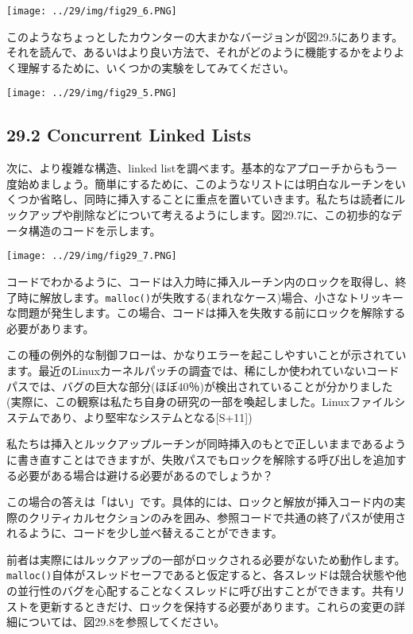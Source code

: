 \texttt{[image: ../29/img/fig29\_6.PNG]}

このようなちょっとしたカウンターの大まかなバージョンが図29.5にあります。それを読んで、あるいはより良い方法で、それがどのように機能するかをよりよく理解するために、いくつかの実験をしてみてください。

\texttt{[image: ../29/img/fig29\_5.PNG]}

\hypertarget{concurrent-linked-lists}{%
\subsection*{29.2 Concurrent Linked
Lists}\label{concurrent-linked-lists}}

次に、より複雑な構造、linked
listを調べます。基本的なアプローチからもう一度始めましょう。簡単にするために、このようなリストには明白なルーチンをいくつか省略し、同時に挿入することに重点を置いていきます。私たちは読者にルックアップや削除などについて考えるようにします。図29.7に、この初歩的なデータ構造のコードを示します。

\texttt{[image: ../29/img/fig29\_7.PNG]}

コードでわかるように、コードは入力時に挿入ルーチン内のロックを取得し、終了時に解放します。\texttt{malloc()}が失敗する(まれなケース)場合、小さなトリッキーな問題が発生します。この場合、コードは挿入を失敗する前にロックを解除する必要があります。

この種の例外的な制御フローは、かなりエラーを起こしやすいことが示されています。最近のLinuxカーネルパッチの調査では、稀にしか使われていないコードパスでは、バグの巨大な部分(ほぼ40％)が検出されていることが分かりました(実際に、この観察は私たち自身の研究の一部を喚起しました。Linuxファイルシステムであり、より堅牢なシステムとなる{[}S+11{]})

私たちは挿入とルックアップルーチンが同時挿入のもとで正しいままであるように書き直すことはできますが、失敗パスでもロックを解除する呼び出しを追加する必要がある場合は避ける必要があるのでしょうか？

この場合の答えは「はい」です。具体的には、ロックと解放が挿入コード内の実際のクリティカルセクションのみを囲み、参照コードで共通の終了パスが使用されるように、コードを少し並べ替えることができます。

前者は実際にはルックアップの一部がロックされる必要がないため動作します。\texttt{malloc()}自体がスレッドセーフであると仮定すると、各スレッドは競合状態や他の並行性のバグを心配することなくスレッドに呼び出すことができます。共有リストを更新するときだけ、ロックを保持する必要があります。これらの変更の詳細については、図29.8を参照してください。

